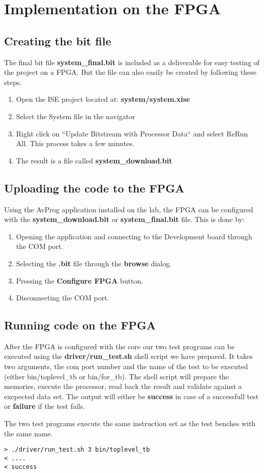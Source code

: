 \section{Implementation on the FPGA}

\subsection{Creating the bit file}
The final bit file {\bf system\_final.bit} is included as a deliverable 
for easy testing of the project on a FPGA. But the file can also easily 
be created by following these steps.

\begin{enumerate}
	\item Open the ISE project located at:
		{\bf system/system.xise}
	\item Select the System file in the navigator
  \item Right click on ``Update Bitstream with Processor Data`` and select ReRun All. This process takes a few minutes. 
	\item The result is a file called {\bf system\_download.bit}
\end{enumerate}


\subsection{Uploading the code to the FPGA}
Using the AvProg application installed on the lab, the FPGA can be configured 
with the {\bf system\_download.bit} or {\bf system\_final.bit} file.
This is done by:

\begin{enumerate}
\item Opening the application and connecting to the Development board through the COM port.
\item Selecting the {\bf .bit} file through the {\bf browse} dialog. 
\item Pressing the {\bf Configure FPGA} button.
\item Disconnecting the COM port. 
\end{enumerate}  

\subsection{Running code on the FPGA}
After the FPGA is configured with the core our two test programs can be executed using
the {\bf driver/run\_test.sh} shell script we have prepared. It takes two arguments,
the com port number and the name of the test to be executed (either bin/toplevel\_tb
or bin/for\_tb). The shell script will prepare the memories, execute the processor,
read back the result and validate against a excpected data set. The output will either
be {\bf success} in case of a successfull test or {\bf failure} if the test fails.

The two test programs execute the same instruction set as the test benches with the same
name.

\begin{verbatim}
> ./driver/run_test.sh 3 bin/toplevel_tb
< ....
< success
\end{verbatim}